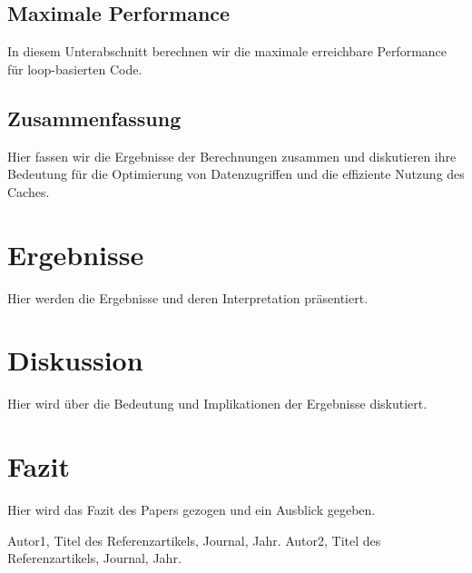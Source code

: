 \documentclass{article}
\begin{document}
    \subsection{Maximale Performance}
    In diesem Unterabschnitt berechnen wir die maximale erreichbare Performance für loop-basierten Code.
    
    \subsection{Zusammenfassung}
    Hier fassen wir die Ergebnisse der Berechnungen zusammen und diskutieren ihre Bedeutung für die Optimierung von Datenzugriffen und die effiziente Nutzung des Caches.

\section{Ergebnisse}
Hier werden die Ergebnisse und deren Interpretation präsentiert.

\section{Diskussion}
Hier wird über die Bedeutung und Implikationen der Ergebnisse diskutiert.

\section{Fazit}
Hier wird das Fazit des Papers gezogen und ein Ausblick gegeben.

\begin{thebibliography}{9}
 Autor1, Titel des Referenzartikels, Journal, Jahr.
 Autor2, Titel des Referenzartikels, Journal, Jahr.
\end{thebibliography}
\end{document}
